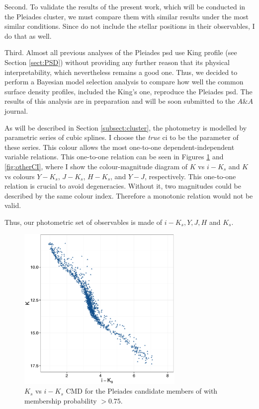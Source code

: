{Second. To validate the results of the present work, which will be conducted in the Pleiades cluster, we must compare them with similar results under the most similar conditions. Since \citet{Bouy2015,Sarro2014} do not include the stellar positions in their observables, I do that as well. }

{Third. Almost all previous analyses of the Pleiades \gls{psd} use King profile (see Section \ref{sect:PSD}) without providing any further reason that its physical interpretability, which nevertheless remains a good one. Thus, we decided to perform a Bayesian model selection analysis to compare how well the common surface density profiles, included the King's one, reproduce the Pleiades \gls{psd}. The results of this analysis are in preparation and will be soon submitted to the $A\&A$ journal. }

As will be described in Section \ref{subsect:cluster}, the photometry is modelled by parametric series of cubic splines. I choose the \emph{true} \gls{ci} to be the parameter of these series. This colour allows the most one-to-one dependent-independent variable relations. This one-to-one relation can be seen in Figures \ref{fig:CI} and \ref{fig:otherCI}, where I show the colour-magnitude diagram of $K$ vs $i-K_s$ and $K$ vs colours $Y-K_s$, $J-K_s$, $H-K_s$, and $Y-J$, respectively.  This one-to-one relation is crucial to avoid degeneracies. Without it, two magnitudes could be described by the same colour index. Therefore a monotonic relation would not be valid. 

Thus, our photometric set of observables is made of $i-K_s, Y,J,H$ and $K_s$. 

\begin{figure}[ht!]
\begin{center}
\includegraphics[page=1,height=8cm]{background/Figures/CIs.pdf}
\caption{$K_s$ vs $i-K_s$ CMD for the Pleiades candidate members of \citet{Bouy2015} with membership probability $>0.75$.}
\label{fig:CI}
\end{center}
\end{figure}

